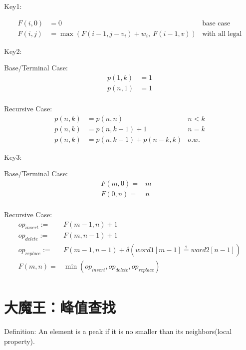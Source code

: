 \documentclass[12pt]{ctexart}
\begin{document}
Key1: 

$$
\begin{aligned}
    F(i, 0) & = 0 & \text{base case}\\
    F(i, j) & = \max(F(i-1, j-v_i) + w_i,\ F(i-1, v)) & \text{with all legal}
\end{aligned}
$$

\quad \newline 
 
Key2:\newline

Base/Terminal Case:
$$
\begin{aligned}
p(1, k) &= 1 \\
p(n, 1) &= 1 \\
\end{aligned}
$$

Recursive Case:
$$
\begin{aligned}
p(n, k) &= p(n, n) & n < k \\
p(n, k) &= p(n, k-1) + 1 & n = k\\
p(n, k) &= p(n, k-1) + p(n-k, k)  & o.w.
\end{aligned}
$$

\quad \newline 

Key3:\newline

Base/Terminal Case:
$$
\begin{aligned}
    F(m, 0) =& m & \ \\
    F(0, n) =& n & \ \\
\end{aligned}
$$

Recursive Case:
$$
\begin{aligned}
    op_{insert} :=& F(m-1, n) + 1 \\
    op_{delete} :=& F(m, n-1) + 1 \\ 
    op_{replace} :=& F(m-1, n-1) + \delta (word1[m-1] \overset{\text{?}}{=} word2[n-1]) \\
    F(m, n) = & \min (op_{insert}, op_{delete}, op_{replace})\\
\end{aligned}
$$

\newpage
\section{大魔王：峰值查找}

Definition: An element is a peak if it is no smaller than its neighbors(local property).
\end{document}

